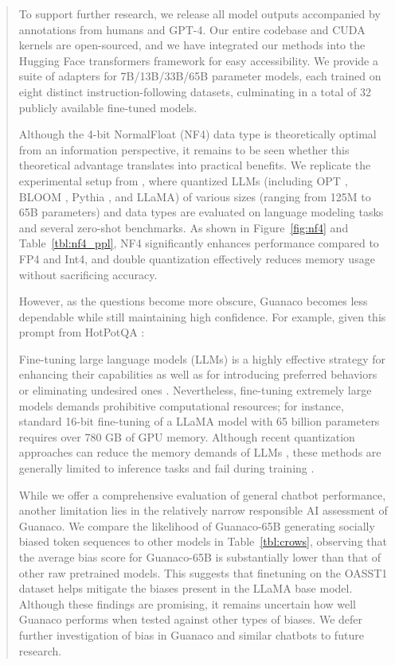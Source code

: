 \begin{quote}
To support further research, we release all model outputs accompanied by annotations from humans and GPT-4. Our entire codebase and CUDA kernels are open-sourced, and we have integrated our methods into the Hugging Face transformers framework \citep{wolf2019huggingface} for easy accessibility. We provide a suite of adapters for 7B/13B/33B/65B parameter models, each trained on eight distinct instruction-following datasets, culminating in a total of 32 publicly available fine-tuned models.

Although the 4-bit NormalFloat (NF4) data type is theoretically optimal from an information perspective, it remains to be seen whether this theoretical advantage translates into practical benefits. We replicate the experimental setup from \citet{dettmers2022case}, where quantized LLMs (including OPT \citep{zhang2022opt}, BLOOM \cite{scao2022bloom}, Pythia \cite{biderman2023pythia}, and LLaMA) of various sizes (ranging from 125M to 65B parameters) and data types are evaluated on language modeling tasks and several zero-shot benchmarks. As shown in Figure~\ref{fig:nf4} and Table~\ref{tbl:nf4_ppl}, NF4 significantly enhances performance compared to FP4 and Int4, and double quantization effectively reduces memory usage without sacrificing accuracy.

However, as the questions become more obscure, {Guanaco} becomes less dependable while still maintaining high confidence. For example, given this prompt from HotPotQA \citep{yang2018hotpotqa}:

Fine-tuning large language models (LLMs) is a highly effective strategy for enhancing their capabilities \citep{min2021metaicl, wei2021finetuned, ouyang2022training, wang2022super, wang2022self, liu2022few} as well as for introducing preferred behaviors or eliminating undesired ones \citep{ouyang2022training,askell2021general,bai2022training}. Nevertheless, fine-tuning extremely large models demands prohibitive computational resources; for instance, standard 16-bit fine-tuning of a LLaMA model with 65 billion parameters \citep{touvron2023llama} requires over 780 GB of GPU memory. Although recent quantization approaches can reduce the memory demands of LLMs \citep{dettmers2022llm, dettmers2022case, frantar2022gptq, xiao2022smoothquant}, these methods are generally limited to inference tasks and fail during training \citep{wortsman2023stable}.

While we offer a comprehensive evaluation of general chatbot performance, another limitation lies in the relatively narrow responsible AI assessment of {Guanaco}. We compare the likelihood of {Guanaco}-65B generating socially biased token sequences to other models in Table~\ref{tbl:crows}, observing that the average bias score for {Guanaco}-65B is substantially lower than that of other raw pretrained models. This suggests that finetuning on the OASST1 dataset helps mitigate the biases present in the LLaMA base model. Although these findings are promising, it remains uncertain how well {Guanaco} performs when tested against other types of biases. We defer further investigation of bias in {Guanaco} and similar chatbots to future research.


\end{quote}
